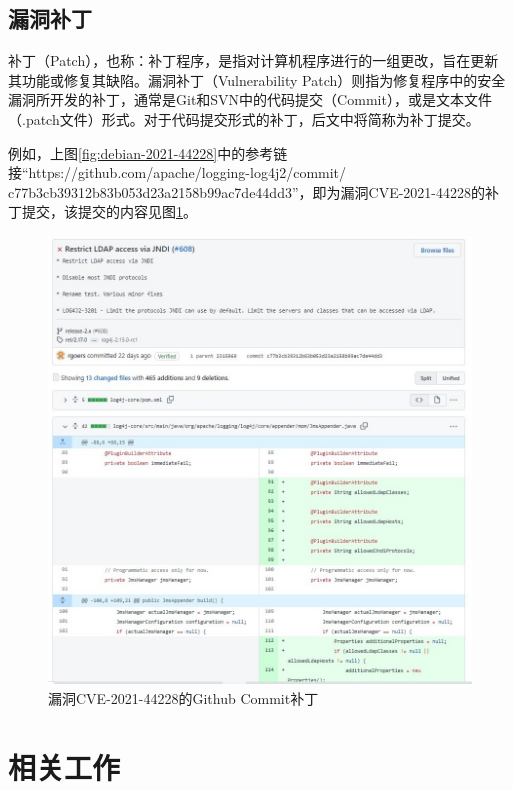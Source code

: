 \subsection{漏洞补丁}
补丁（Patch），也称：补丁程序，是指对计算机程序进行的一组更改，旨在更新其功能或修复其缺陷。漏洞补丁（Vulnerability Patch）则指为修复程序中的安全漏洞所开发的补丁，通常是Git和SVN中的代码提交（Commit），或是文本文件（.patch文件）形式。对于代码提交形式的补丁，后文中将简称为补丁提交。

例如，上图\ref{fig:debian-2021-44228}中的参考链接“https://github.com/apache/logging-log4j2/commit/\\c77b3cb39312b83b053d23a2158b99ac7de44dd3”，即为漏洞CVE-2021-44228的补丁提交，该提交的内容见图\ref{fig:commit-2021-44228}。

\begin{figure}[h]
    \centering
    \includegraphics[width=1.0\textwidth]{fig/commit-2021-44228}
    \caption{漏洞CVE-2021-44228的Github Commit补丁}
    \label{fig:commit-2021-44228}
\end{figure}



\section{相关工作}
